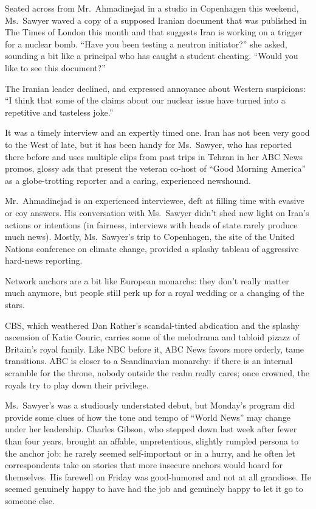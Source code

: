 ﻿\documentclass[12pt]{article}
\begin{document}
Seated across from Mr.~Ahmadinejad in a studio in Copenhagen this weekend, Ms.~Sawyer waved a copy
of a supposed Iranian document that was published in The Times of London this month and that
suggests Iran is working on a trigger for a nuclear bomb. ``Have you been testing a neutron
initiator?'' she asked, sounding a bit like a principal who has caught a student cheating. ``Would
you like to see this document?''

The Iranian leader declined, and expressed annoyance about Western suspicions: ``I think that some
of the claims about our nuclear issue have turned into a repetitive and tasteless joke.''

It was a timely interview and an expertly timed one. Iran has not been very good to the West of
late, but it has been handy for Ms.~Sawyer, who has reported there before and uses multiple clips
from past trips in Tehran in her ABC News promos, glossy ads that present the veteran co-host of
``Good Morning America'' as a globe-trotting reporter and a caring, experienced newshound.

Mr.~Ahmadinejad is an experienced interviewee, deft at filling time with evasive or coy answers. His
conversation with Ms.~Sawyer didn't shed new light on Iran's actions or intentions (in fairness,
interviews with heads of state rarely produce much news). Mostly, Ms.~Sawyer's trip to Copenhagen,
the site of the United Nations conference on climate change, provided a splashy tableau of
aggressive hard-news reporting.

Network anchors are a bit like European monarchs: they don't really matter much anymore, but people
still perk up for a royal wedding or a changing of the stars.

CBS, which weathered Dan Rather's scandal-tinted abdication and the splashy ascension of Katie
Couric, carries some of the melodrama and tabloid pizazz of Britain's royal family. Like NBC before
it, ABC News favors more orderly, tame transitions. ABC is closer to a Scandinavian monarchy: if
there is an internal scramble for the throne, nobody outside the realm really cares; once crowned,
the royals try to play down their privilege.

Ms.~Sawyer's was a studiously understated debut, but Monday's program did provide some clues of how
the tone and tempo of ``World News'' may change under her leadership. Charles Gibson, who stepped
down last week after fewer than four years, brought an affable, unpretentious, slightly rumpled
persona to the anchor job: he rarely seemed self-important or in a hurry, and he often let
correspondents take on stories that more insecure anchors would hoard for themselves. His farewell
on Friday was good-humored and not at all grandiose. He seemed genuinely happy to have had the job
and genuinely happy to let it go to someone else.
\end{document}
